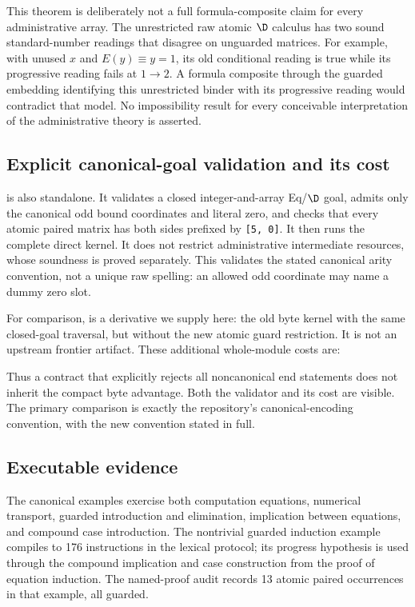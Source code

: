 This theorem is deliberately not a full formula-composite claim for
every administrative array. The unrestricted raw atomic $\D$ calculus
has two sound standard-number readings that disagree on unguarded
matrices. For example, with unused $x$ and $E(y)\equiv y=1$, its old
conditional reading is true while its progressive reading fails at
$1\to2$. A formula composite through the guarded embedding identifying
this unrestricted binder with its progressive reading would contradict
that model. No impossibility result for every conceivable interpretation
of the administrative theory is asserted.

\subsection{Explicit canonical-goal validation and its cost}
 is also standalone. It validates a closed
integer-and-array Eq/$\D$ goal, admits only the canonical odd bound
coordinates and literal zero, and checks that every atomic paired
matrix has both sides prefixed by \texttt{[5, 0]}. It then runs the
complete direct kernel. It does not restrict administrative intermediate
resources, whose soundness is proved separately. This validates the stated
canonical arity convention, not a unique raw spelling: an allowed odd
coordinate may name a dummy zero slot.

For comparison,  is a derivative
we supply here: the old byte kernel with the same closed-goal traversal,
but without the new atomic guard restriction. It is not an upstream
frontier artifact. These additional whole-module costs are:

Thus a contract that explicitly rejects all noncanonical end statements
does not inherit the compact byte advantage. Both the validator and its
cost are visible. The primary comparison is exactly the repository's
canonical-encoding convention, with the new convention stated in full.

\subsection{Executable evidence}


The canonical examples exercise both computation equations, numerical
transport, guarded introduction and elimination, implication between
equations, and compound case introduction. The nontrivial guarded
induction example compiles to 176 instructions in the lexical protocol;
its progress hypothesis is used through the compound implication and
case construction from the proof of equation induction. The named-proof
audit records 13 atomic paired occurrences in that example, all guarded.

